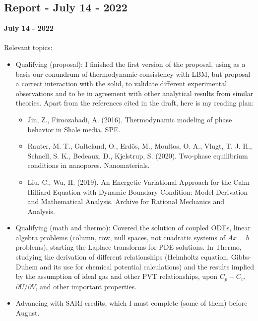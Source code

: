\documentclass[8pt]{beamer}
\begin{document}
	
	\subsection{Report - July 14 - 2022}
	\label{}
	\justifying
	\begin{frame}{}
		\textbf{July 14 - 2022}\\~\\
		Relevant topics:
		\begin{itemize}
			\item Qualifying (proposal): I finished the first version of the proposal, using as a basis our conundrum of thermodynamic consistency with LBM, but proposal a correct interaction with the solid, to validate different experimental observations and to be in agreement with other analytical results from similar theories. Apart from the references cited in the draft, here is my reading plan:
			\begin{itemize}
				\item Jin, Z., Firoozabadi, A. (2016). Thermodynamic modeling of phase behavior in Shale media. SPE.
				\item Rauter, M. T., Galteland, O., Erdős, M., Moultos, O. A., Vlugt, T. J. H., Schnell, S. K., Bedeaux, D., Kjelstrup, S. (2020). Two-phase equilibrium conditions in nanopores. Nanomaterials.
				\item Liu, C., Wu, H. (2019). An Energetic Variational Approach for the Cahn–Hilliard Equation with Dynamic Boundary Condition: Model Derivation and Mathematical Analysis. Archive for Rational Mechanics and Analysis.
			\end{itemize}
		
			\item Qualifying (math and thermo): Covered the solution of coupled ODEs, linear algebra problems (column, row, null spaces, not cuadratic systems of $Ax =b$ problems), starting the Laplace transforms for PDE solutions. In Thermo, studying the derivation of different relationships (Helmholtz equation, Gibbs-Duhem and its use for chemical potential calculations) and the results implied by the assumption of ideal gas and other PVT relationships, upon $C_p - C_v$, $\partial U/ \partial V$, and other important properties.
			\item Advancing with SARI credits, which I must complete (some of them) before August. 
			
		\end{itemize}
	\end{frame}
	
\end{document}
